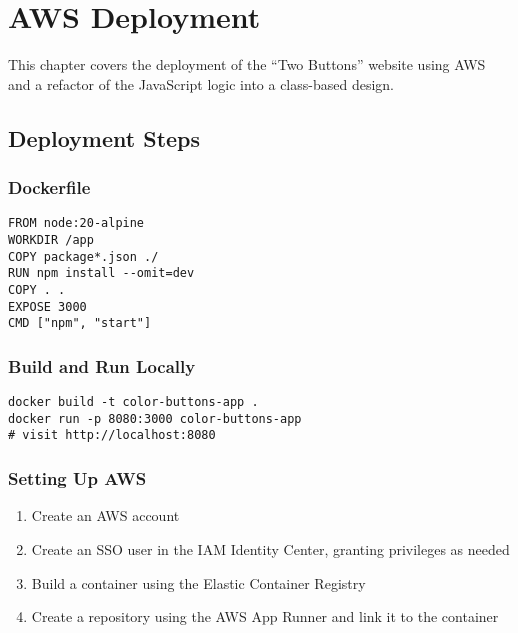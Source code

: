 \chapter{AWS Deployment}
\label{ch:aws-deployment}

This chapter covers the deployment of the ``Two Buttons'' website using AWS 
and a refactor of the JavaScript logic into a class-based design.

\section{Deployment Steps}

\subsection{Dockerfile}
\begin{verbatim}
FROM node:20-alpine
WORKDIR /app
COPY package*.json ./
RUN npm install --omit=dev
COPY . .
EXPOSE 3000
CMD ["npm", "start"]
\end{verbatim}

\subsection{Build and Run Locally}
\begin{verbatim}
docker build -t color-buttons-app .
docker run -p 8080:3000 color-buttons-app
# visit http://localhost:8080
\end{verbatim}

\subsection{Setting Up AWS}
\begin{enumerate}
    \item Create an AWS account
    \item Create an SSO user in the IAM Identity Center, granting privileges as needed
    \item Build a container using the Elastic Container Registry
    \item Create a repository using the AWS App Runner and link it to the container
\end{enumerate}

